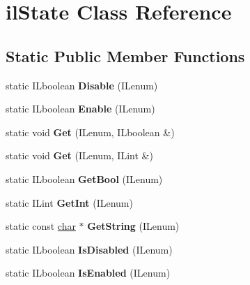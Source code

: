 \hypertarget{classilState}{}\section{il\+State Class Reference}
\label{classilState}
\subsection*{Static Public Member Functions}
\begin{DoxyCompactItemize}
\item 
\mbox{\label{classilState_ac9440a428fa8f60dc38bbd36aeb0d14f}} 
static I\+Lboolean {\bfseries Disable} (I\+Lenum)
\item 
\mbox{\label{classilState_a84fd8d63a9a8223cd541581f7d977288}} 
static I\+Lboolean {\bfseries Enable} (I\+Lenum)
\item 
\mbox{\label{classilState_acb6038ebd374345c90a9352210ca54c3}} 
static void {\bfseries Get} (I\+Lenum, I\+Lboolean \&)
\item 
\mbox{\label{classilState_a043d52abf96a454576370999ed6ec4d1}} 
static void {\bfseries Get} (I\+Lenum, I\+Lint \&)
\item 
\mbox{\label{classilState_ae441a98d6737e397a7344e5211c4ffb0}} 
static I\+Lboolean {\bfseries Get\+Bool} (I\+Lenum)
\item 
\mbox{\label{classilState_aa302caef23ed1be95c70f11ed3bec543}} 
static I\+Lint {\bfseries Get\+Int} (I\+Lenum)
\item 
\mbox{\label{classilState_a63d90926bc9c72f01f8e2b43edc66bec}} 
static const \hyperlink{classchar}{char} $\ast$ {\bfseries Get\+String} (I\+Lenum)
\item 
\mbox{\label{classilState_ac50b8ce7b74a34168e63029e78090b46}} 
static I\+Lboolean {\bfseries Is\+Disabled} (I\+Lenum)
\item 
\mbox{\label{classilState_aa3273e02c334b059ad42084f2b15dc5b}} 
static I\+Lboolean {\bfseries Is\+Enabled} (I\+Lenum)
\item 

\end{DoxyCompactItemize}
